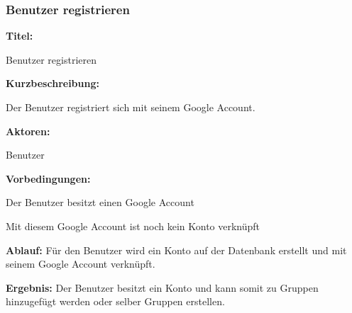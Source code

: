 \documentclass{scrartcl}
\begin{document}
	\subsubsection{Benutzer registrieren}
	\begin{description}
		\item \textbf{Titel:}
		\begin{description}
			\item Benutzer registrieren
		\end{description}
		\item \textbf{Kurzbeschreibung:}
		\begin{description}
			\item Der Benutzer registriert sich mit seinem Google Account.
		\end{description}
		\item \textbf{Aktoren:}
		\begin{description}
			\item Benutzer 
		\end{description}
		\item \textbf{Vorbedingungen:}
		\begin{description}
			\item Der Benutzer besitzt einen Google Account
			\item Mit diesem Google Account ist noch kein Konto verknüpft
		\end{description}
		\item \textbf{Ablauf:} \newline Für den Benutzer wird ein Konto auf der Datenbank erstellt und mit seinem Google Account verknüpft.
		\item \textbf{Ergebnis:} \newline Der Benutzer besitzt ein Konto und kann somit zu Gruppen hinzugefügt werden oder selber Gruppen erstellen.
	\end{description}
	
	\newpage
	
\end{document}
